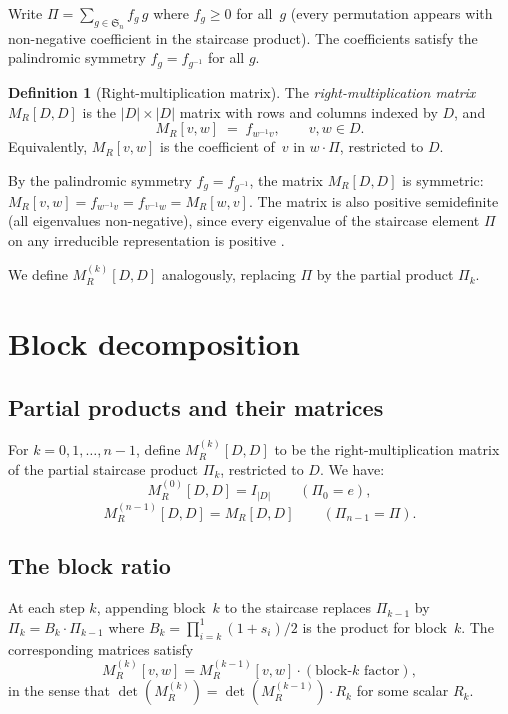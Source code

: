 \documentclass[11pt]{article}
\theoremstyle{definition}
\newtheorem{definition}[theorem]{Definition}
\theoremstyle{remark}
\newcommand{\Sym}{\mathfrak{S}}
\begin{document}
Write $\Pi = \sum_{g \in \Sym_n} f_g\, g$ where $f_g \ge 0$ for all~$g$
(every permutation appears with non-negative coefficient in the staircase
product).  The coefficients satisfy the palindromic symmetry
$f_g = f_{g^{-1}}$ for all $g$.

\begin{definition}[Right-multiplication matrix]
The \emph{right-multiplication matrix} $M_R[D,D]$ is the
$|D| \times |D|$ matrix with rows and columns indexed by $D$, and
\[
  M_R[v, w] \;=\; f_{w^{-1} v}, \qquad v, w \in D.
\]
Equivalently, $M_R[v,w]$ is the coefficient of~$v$ in $w \cdot \Pi$,
restricted to $D$.
\end{definition}

By the palindromic symmetry $f_g = f_{g^{-1}}$, the matrix
$M_R[D,D]$ is symmetric: $M_R[v,w] = f_{w^{-1}v} = f_{v^{-1}w}
= M_R[w,v]$.  The matrix is also positive semidefinite (all
eigenvalues non-negative), since every eigenvalue of the staircase
element $\Pi$ on any irreducible representation is positive
\cite{Clio-EP}.

We define $M_R^{(k)}[D,D]$ analogously, replacing $\Pi$ by the
partial product $\Pi_k$.

\section{Block decomposition}

\subsection{Partial products and their matrices}

For $k = 0, 1, \ldots, n-1$, define $M_R^{(k)}[D,D]$ to be the
right-multiplication matrix of the partial staircase product $\Pi_k$,
restricted to $D$.  We have:
\[
  M_R^{(0)}[D,D] = I_{|D|} \qquad (\Pi_0 = e),
\]
\[
  M_R^{(n-1)}[D,D] = M_R[D,D] \qquad (\Pi_{n-1} = \Pi).
\]

\subsection{The block ratio}

At each step $k$, appending block~$k$ to the staircase replaces
$\Pi_{k-1}$ by $\Pi_k = B_k \cdot \Pi_{k-1}$ where
$B_k = \prod_{i=k}^{1} (1+s_i)/2$ is the product for block~$k$.
The corresponding matrices satisfy
\[
  M_R^{(k)}[v,w] = M_R^{(k-1)}[v,w] \cdot (\text{block-$k$ factor}),
\]
in the sense that $\det(M_R^{(k)}) = \det(M_R^{(k-1)}) \cdot R_k$
for some scalar $R_k$.
\end{document}
